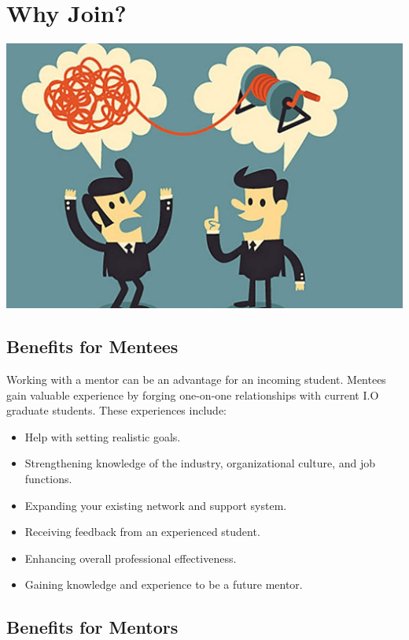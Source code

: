 \documentclass[
  openany]{book}
\providecommand{\tightlist}{%
  \setlength{\itemsep}{0pt}\setlength{\parskip}{0pt}}
\begin{document}
\hypertarget{why-join}{%
\chapter{Why Join?}\label{why-join}}

\includegraphics{images/why.jpeg}

\hypertarget{benefits-for-mentees}{%
\section{Benefits for Mentees}\label{benefits-for-mentees}}

Working with a mentor can be an advantage for an incoming student. Mentees gain valuable experience by forging one-on-one relationships with current I.O graduate students. These experiences include:

\begin{itemize}
\tightlist
\item
  Help with setting realistic goals.
\item
  Strengthening knowledge of the industry, organizational culture, and job functions.
\item
  Expanding your existing network and support system.
\item
  Receiving feedback from an experienced student.
\item
  Enhancing overall professional effectiveness.
\item
  Gaining knowledge and experience to be a future mentor.
\end{itemize}

\hypertarget{benefits-for-mentors}{%
\section{Benefits for Mentors}\label{benefits-for-mentors}}
\end{document}
